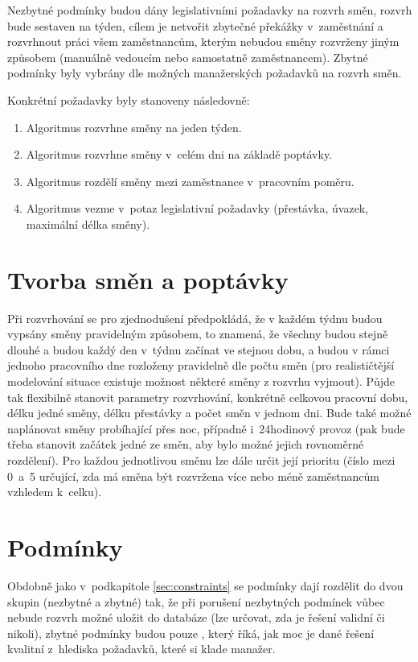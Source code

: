 \documentclass[a4paper,11pt,openany,twoside]{book}
\begin{document}
Nezbytné podmínky budou dány legislativními požadavky na rozvrh směn, rozvrh bude sestaven na týden, cílem je netvořit zbytečné překážky v~zaměstnání a rozvrhnout práci všem zaměstnancům, kterým nebudou směny rozvrženy jiným způsobem (manuálně vedoucím nebo samostatně zaměstnancem). Zbytné podmínky byly vybrány dle možných manažerských požadavků na rozvrh směn.

Konkrétní požadavky byly stanoveny následovně:
\begin{enumerate}
	\item Algoritmus rozvrhne směny na jeden týden.
	\item Algoritmus rozvrhne směny v~celém dni na základě poptávky.
	\item Algoritmus rozdělí směny mezi zaměstnance v~pracovním poměru.
	\item Algoritmus vezme v~potaz legislativní požadavky (přestávka, úvazek, maximální délka směny).
\end{enumerate}

\section{Tvorba směn a poptávky}\label{sub:demand}
Při rozvrhování se pro zjednodušení předpokládá, že v každém týdnu budou vypsány směny pravidelným způsobem, to znamená, že všechny budou stejně dlouhé a budou každý den v~týdnu začínat ve stejnou dobu, a budou v rámci jednoho pracovního dne rozloženy pravidelně dle počtu směn (pro realističtější modelování situace existuje možnost některé směny z rozvrhu vyjmout). Půjde tak flexibilně stanovit parametry rozvrhování, konkrétně celkovou pracovní dobu, délku jedné směny, délku přestávky a počet směn v jednom dni. Bude také možné naplánovat směny probíhající přes noc, případně i~24hodinový provoz (pak bude třeba stanovit začátek jedné ze směn, aby bylo možné jejich rovnoměrné rozdělení). Pro každou jednotlivou směnu lze dále určit její prioritu (číslo mezi 0~a~5 určující, zda má směna být rozvržena více nebo méně zaměstnancům vzhledem k~celku).

\section{Podmínky}
Obdobně jako v~podkapitole \ref{sec:constraints} se podmínky dají rozdělit do dvou skupin (nezbytné a zbytné) tak, že při porušení nezbytných podmínek vůbec nebude rozvrh možné uložit do databáze (lze určovat, zda je řešení validní či nikoli), zbytné podmínky budou pouze , který říká, jak moc je dané řešení kvalitní z~hlediska požadavků, které si klade manažer.
\end{document}
